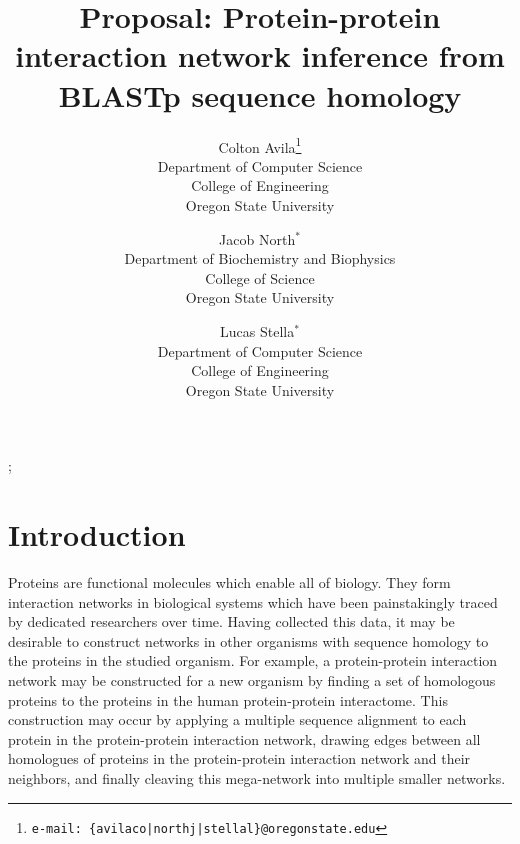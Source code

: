 \documentclass{acmsiggraph}               %
\title{Proposal: Protein-protein interaction network inference from BLASTp sequence homology}
\author{Colton Avila\thanks{\small\texttt{e-mail: \{avilaco|northj|stellal\}@oregonstate.edu}}\\Department of Computer Science\\College of Engineering\\ Oregon State University
\and Jacob North$^{\ast}$ \\
Department of Biochemistry and Biophysics\\College of Science\\Oregon State University
\and Lucas Stella$^{\ast}$ \\
Department of Computer Science\\College of Engineering\\Oregon State University}
\begin{document}

\maketitle



\copyrightspace





\begin{CRcatlist}
  ;
\end{CRcatlist}

\keywordlist


\section{Introduction}
\label{sec:intro}
Proteins are functional molecules which enable all of biology. They form interaction networks in biological systems which have been painstakingly traced by dedicated researchers over time. Having collected this data, it may be desirable to construct networks in other organisms with sequence homology to the proteins in the studied organism. For example, a protein-protein interaction network may be constructed for a new organism by finding a set of homologous proteins to the proteins in the human protein-protein interactome. This construction may occur by applying a multiple sequence alignment to each protein in the protein-protein interaction network, drawing edges between all homologues of proteins in the protein-protein interaction network and their neighbors, and finally cleaving this mega-network into multiple smaller networks.

\end{document}

